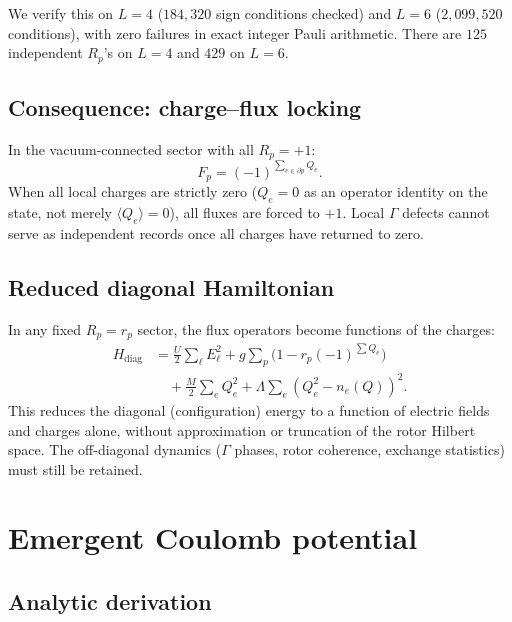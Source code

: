 \documentclass[aps,prb,twocolumn,superscriptaddress,showpacs]{revtex4-2}
\begin{document}
We verify this on $L=4$ ($184{,}320$ sign conditions checked) and
$L=6$ ($2{,}099{,}520$ conditions), with zero failures in exact
integer Pauli arithmetic. There are $125$ independent $R_p$'s on
$L=4$ and $429$ on $L=6$.

\subsection{Consequence: charge--flux locking}

In the vacuum-connected sector with all $R_p=+1$:
\begin{equation}
F_p = (-1)^{\sum_{e\in\partial p}Q_e}.
\end{equation}
When all local charges are strictly zero ($Q_e=0$ as an operator
identity on the state, not merely $\langle Q_e\rangle=0$), all
fluxes are forced to $+1$. Local $\Gamma$ defects cannot serve as
independent records once all charges have returned to zero.

\subsection{Reduced diagonal Hamiltonian}

In any fixed $R_p=r_p$ sector, the flux operators become functions
of the charges:
\begin{align}
H_{\mathrm{diag}} &= \frac{U}{2}\sum_\ell E_\ell^2
+ g\sum_p\bigl(1-r_p(-1)^{\sum Q_e}\bigr) \nonumber\\
&\quad + \frac{M}{2}\sum_e Q_e^2
+ \Lambda\sum_e(Q_e^2-n_e(Q))^2.
\end{align}
This reduces the diagonal (configuration) energy to a function of
electric fields and charges alone, without approximation or truncation
of the rotor Hilbert space. The off-diagonal dynamics ($\Gamma$ phases,
rotor coherence, exchange statistics) must still be retained.

\section{Emergent Coulomb potential}
\label{sec:coulomb}

\subsection{Analytic derivation}
\end{document}
